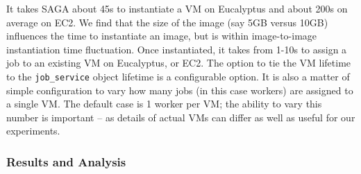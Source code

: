 \documentclass[3p,twocolumn]{elsarticle}
\begin{document}
It takes SAGA about 45s to instantiate a VM on Eucalyptus
  and about 200s on average on EC2.
We find that the size of the image (say 5GB versus 10GB) influences
the time to instantiate an image, but is within image-to-image
instantiation time fluctuation.  Once instantiated, it takes from
1-10s to assign a job to an existing VM on Eucalyptus, or EC2.  The
option to tie the VM lifetime to the \texttt{job\_service} object
lifetime is a configurable option.  It is also a matter of simple
configuration to vary how many jobs (in this case workers) are
assigned to a single VM. The default case is 1 worker per VM; the
ability to vary this number is important -- as details of actual VMs
can differ as well as useful for our experiments.




\subsubsection{Results and Analysis}
\end{document}
